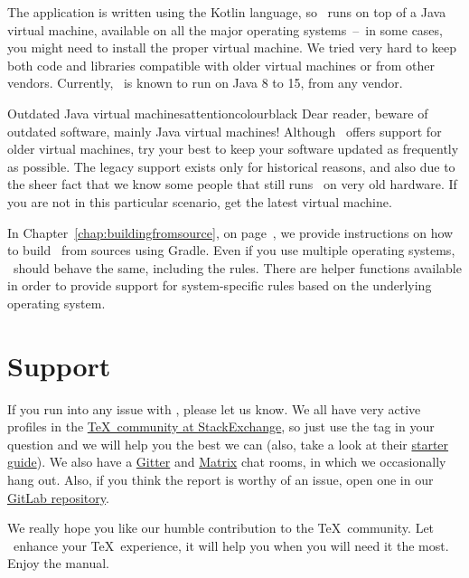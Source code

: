 The application is written using the Kotlin language, so \arara\ runs on top of a Java virtual machine, available on all the major operating systems~--~in some cases, you might need to install the proper virtual machine. We tried very hard to keep both code and libraries compatible with older virtual machines or from other vendors. Currently, \arara\ is known to run on Java 8 to 15, from any vendor.

\begin{messagebox}{Outdated Java virtual machines}{attentioncolour}{\icerror}{black}
Dear reader, beware of outdated software, mainly Java virtual machines! Although \arara\ offers support for older virtual machines, try your best to keep your software updated as frequently as possible. The legacy support exists only for historical reasons, and also due to the sheer fact that we know some people that still runs \arara\ on very old hardware. If you are not in this particular scenario, get the latest virtual machine.
\end{messagebox}

In Chapter~\ref{chap:buildingfromsource}, on page~\pageref{chap:buildingfromsource}, we provide instructions on how to build \arara\ from sources using Gradle. Even if you use multiple operating systems, \arara\ should behave the same, including the rules. There are helper functions available in order to provide support for system-specific rules based on the underlying operating system.

\section{Support}
\label{sec:support}

If you run into any issue with \arara, please let us know. We all have very active profiles in the \href{https://tex.stackexchange.com/}{\TeX\ community at StackExchange}, so just use the  tag in your question and we will help you the best we can (also, take a look at their \href{https://tex.meta.stackexchange.com/q/1436}{starter guide}).  We also have a \href{https://gitter.im/Island-of-TeX/arara}{Gitter} and \href{https://matrix.to/#/!HfEWIEvFtDplCLSQvz:matrix.org?via=matrix.org}{Matrix} chat rooms, in which we occasionally hang out. Also, if you think the report is worthy of an issue, open one in our \href{https://gitlab.com/islandoftex/arara/issues}{GitLab repository}.

We really hope you like our humble contribution to the \TeX\ community. Let \arara\ enhance your \TeX\ experience, it will help you when you will need it the most. Enjoy the manual.
